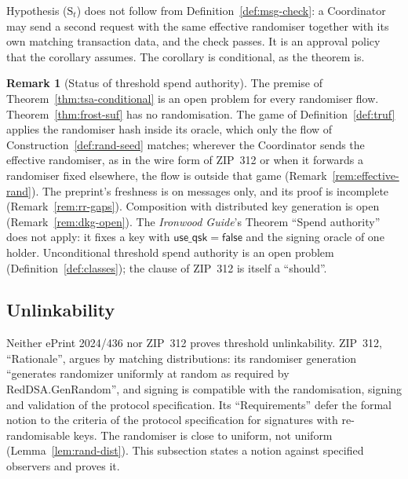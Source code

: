 \documentclass[11pt,a4paper]{article}
\theoremstyle{definition}
\newtheorem{remark}[theorem]{Remark}
\begin{document}
Hypothesis (\(\mathrm{S}_t\)) does not follow from
Definition~\ref{def:msg-check}: a Coordinator may send a second request with
the same effective randomiser together with its own matching transaction
data, and the check passes. It is an approval policy that the corollary
assumes. The corollary is conditional, as the theorem is.

\begin{remark}[Status of threshold spend authority]
\label{rem:authority-status}
The premise of Theorem~\ref{thm:tsa-conditional} is an open problem for
every randomiser flow. Theorem~\ref{thm:frost-suf} has no randomisation. The
game of Definition~\ref{def:truf} applies the randomiser hash inside its
oracle, which only the flow of Construction~\ref{def:rand-seed} matches;
wherever the Coordinator sends the effective randomiser, as in the wire form
of ZIP~312 or when it forwards a randomiser fixed elsewhere, the flow is
outside that game (Remark~\ref{rem:effective-rand}). The preprint's
freshness is on messages only, and its proof is incomplete
(Remark~\ref{rem:rr-gaps}). Composition with distributed key generation is
open (Remark~\ref{rem:dkg-open}). The \emph{Ironwood Guide}'s Theorem
``Spend authority'' does not apply: it fixes a key with
\(\mathsf{use\_qsk} = \mathsf{false}\) and the signing oracle of one holder.
Unconditional threshold spend authority is an open problem
(Definition~\ref{def:classes}); the clause of ZIP~312 is itself a
``should''.
\end{remark}

\subsection{Unlinkability}\label{sec:sec-unlink}

Neither ePrint 2024/436 nor ZIP~312 proves threshold unlinkability. ZIP~312,
``Rationale'', argues by matching distributions: its randomiser generation
``generates randomizer uniformly at random as required by
RedDSA.GenRandom'', and signing is compatible with the randomisation,
signing and validation of the protocol specification. Its
``Requirements'' defer the formal notion to the criteria of the protocol
specification for signatures with re-randomisable keys. The randomiser is
close to uniform, not uniform (Lemma~\ref{lem:rand-dist}). This subsection
states a notion against specified observers and proves it.
\end{document}
